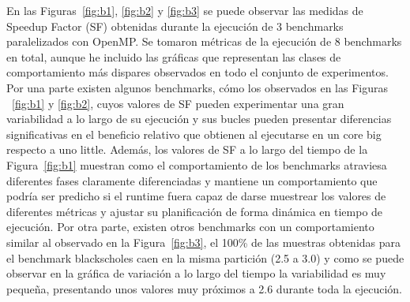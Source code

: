 En las Figuras~\ref{fig:b1}, \ref{fig:b2} y \ref{fig:b3} se puede observar las medidas de Speedup Factor (SF) obtenidas durante la ejecución de 3 benchmarks paralelizados con OpenMP. Se tomaron métricas de la ejecución de 8 benchmarks en total, aunque he incluido las gráficas que representan las clases de comportamiento más dispares observados en todo el conjunto de experimentos. Por una parte existen algunos benchmarks, cómo los observados en las Figuras ~\ref{fig:b1} y \ref{fig:b2}, cuyos valores de SF pueden experimentar una gran variabilidad a lo largo de su ejecución y sus bucles pueden presentar diferencias significativas en el beneficio relativo que obtienen al ejecutarse en un core big respecto a uno little. Además, los valores de SF a lo largo del tiempo de la Figura~\ref{fig:b1} muestran como el comportamiento de los benchmarks atraviesa diferentes fases claramente diferenciadas y mantiene un comportamiento que podría ser predicho si el runtime fuera capaz de darse muestrear los valores de diferentes métricas y ajustar su planificación de forma dinámica en tiempo de ejecución. Por otra parte, existen otros benchmarks con un comportamiento similar al observado en la Figura~\ref{fig:b3}, el 100\% de las muestras obtenidas para el benchmark blackscholes caen en la misma partición (2.5 a 3.0) y como se puede observar en la gráfica de variación a lo largo del tiempo la variabilidad es muy pequeña, presentando unos valores muy próximos a 2.6 durante toda la ejecución. 

